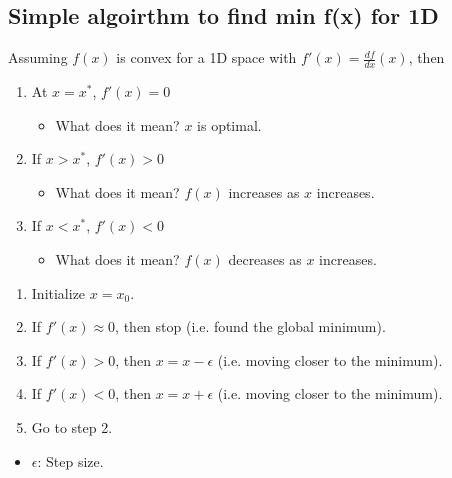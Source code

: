 \subsection{Simple algoirthm to find min f(x) for 1D}
\begin{intuition}
    Assuming $f(x)$ is convex for a 1D space with \( f'(x) = \frac{df}{dx}(x) \), then 
    \begin{enumerate}
    
        \item At \( x = x^* \), \( f'(x) = 0 \)
        \begin{itemize}
            \item What does it mean? \( x \) is optimal.
        \end{itemize}
    
        \item If \( x > x^* \), \( f'(x) > 0 \)
        \begin{itemize}
            \item What does it mean? \( f(x) \) increases as \( x \) increases.
        \end{itemize}
    
        \item If \( x < x^* \), \( f'(x) < 0 \)
        \begin{itemize}
            \item What does it mean? \( f(x) \) decreases as \( x \) increases.
        \end{itemize}
        
    \end{enumerate}   
\end{intuition}

\begin{definition}
    \begin{enumerate}
        \item Initialize $x = x_0$.
        \item If $f'(x) \approx 0$, then stop (i.e. found the global minimum).
        \item If $f'(x) > 0$, then $x = x - \epsilon$ (i.e. moving closer to the minimum).
        \item If $f'(x) < 0$, then $x = x + \epsilon$ (i.e. moving closer to the minimum).
        \item Go to step 2.
    \end{enumerate}
    \vspace{1em}

    \begin{itemize}
        \item $\epsilon$: Step size.
    \end{itemize}
\end{definition}

